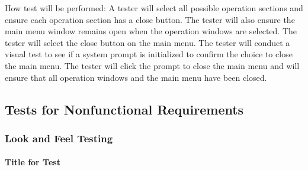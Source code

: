 \documentclass[12pt, titlepage]{article}
\begin{document}
\begin{enumerate}
How test will be performed: A tester will select all possible operation sections and ensure each operation section has a close button. The tester will also ensure the main menu window remains open when the operation windows are selected. The tester will select the close button on the main menu. The tester will conduct a visual test to see if a system prompt is initialized to confirm the choice to close the main menu. The tester will click the prompt to close the main menu and will ensure that all operation windows and the main menu have been closed. 




\end{enumerate}

\subsection{Tests for Nonfunctional Requirements}

\subsubsection{Look and Feel Testing}
		
\paragraph{Title for Test}
\end{document}
